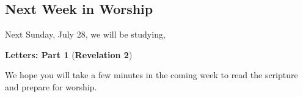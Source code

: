 \subsection{Next Week in Worship}
\label{nextweekworship}

Next Sunday, July 28, we will be studying, 

 \textbf{Letters: Part 1} 
 (\textbf{Revelation 2}) 

 We hope you will take a few minutes in the coming week to read the scripture and prepare for worship.
